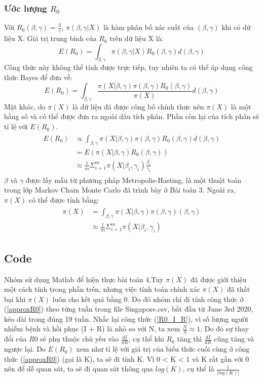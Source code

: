 \subsubsection{Ước lượng $R_0$}
    Với $R_0(\beta, \gamma) = \frac{\beta}{\gamma}$, $\pi(\beta, \gamma | X)$ là hàm phân bố xác suất của $(\beta, \gamma)$ khi có dữ liệu X. Giá trị trung bình của $R_0$ trên dữ liệu X là:
    $$E(R_0) = \int_{\beta, \gamma} \pi(\beta, \gamma | X)R_0(\beta, \gamma)d(\beta, \gamma)$$
    Công thức này không thể tính được trực tiếp, tuy nhiên ta có thể áp dụng công thức Bayes để đưa về:
    $$E(R_0) = \int_{\beta, \gamma} \frac{\pi(X | \beta, \gamma)\pi(\beta, \gamma)R_0(\beta, \gamma)}{\pi(X)}d(\beta, \gamma)$$
    Mặt khác, do $\pi(X)$ là dữ liệu đã được công bố chính thưc nên $\pi(X)$ là một hằng số và có thể được đưa ra ngoài dấu tích phân. Phần còn lại của tích phân sẽ tỉ lệ với $E(R_0)$.
    \begin{align}\label{approxR0}
        \begin{split}
            E(R_0) & \propto \int_{\beta, \gamma} \pi(X | \beta, \gamma)\pi(\beta, \gamma)R_0(\beta, \gamma)d(\beta, \gamma) \\
            & =E(\pi(X|\beta, \gamma)R_0(\beta, \gamma))\\
            & \approx \frac{1}{m} \Sigma_{i = 1}^{m} \pi(X|\beta_i, \gamma_i) \frac{\beta_i}{\gamma_i}
        \end{split}
    \end{align}
    $\beta$ và $\gamma$ được lấy mẫu từ phương pháp Metropolis-Hasting, là một thuật toán trong lớp Markov Chain Monte Carlo đã trình bày ở Bài toán 3.
    Ngoài ra, $\pi(X)$ có thể được tính bằng:
    \begin{align}
        \begin{split}
            \pi(X) & = \int_{\beta, \gamma} \pi(X | \beta, \gamma)\pi(\beta, \gamma)(\beta, \gamma) \\
            & \approx \frac{1}{m} \Sigma_{i = 1}^{m} \pi(X|\beta_i, \gamma_i)
        \end{split}
    \end{align}
    
    
\subsection{Code}
Nhóm sử dụng Matlab để hiện thực bài toán 4.Tuy $\pi(X)$ đã được giới thiệu một cách tính trong phần trên, nhưng việc tính toán chính xác $\pi(X)$ đã thất bại khi $\pi(X)$ luôn cho kết quả bằng 0. Do đó nhóm chỉ đi tính công thức ở (\ref{approxR0}) theo từng tuần trong file Singapore.csv, bắt đầu từ June 3rd 2020, kéo dài trong đúng 19 tuần. 
Nhắc lại công thức (\ref{R0_I_R}), vì số lượng người nhiễm bệnh và hồi phục (I + R) là nhỏ so với N, ta xem $\frac{N}{S} \approx 1$. Do đó sự thay đổi của $R0$ sẽ phụ thuộc chủ yếu vào $\frac{dI}{dR}$, cụ thể khi $R_0$ tăng thì $\frac{dI}{dR}$ cũng tăng và ngược lại. Do $E(R_0)$ xem như tỉ lệ với giá trị của biểu thức cuối cùng ở công thức (\ref{approxR0}) (gọi là K), ta sẽ đi tính K. Vì 0 < K < 1 và K rất gần với 0 nên để dễ quan sát, ta sẽ đi quan sát thông qua $log(K)$, cụ thể là $\frac{1}{|log(K)|}$ \\



